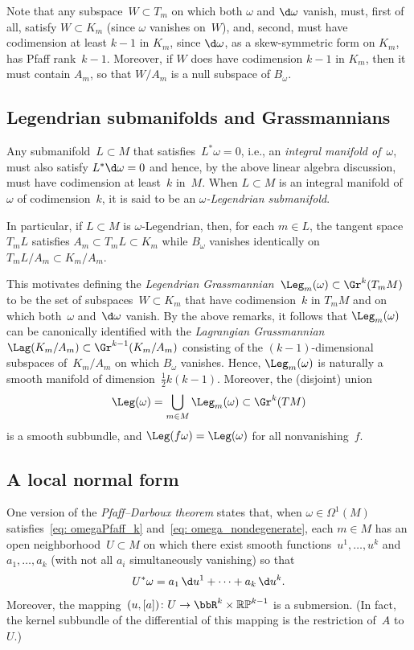 Note that any subspace~$W\subset T_m$ on which both $\omega$ and $\d\omega$
vanish, must, first of all, satisfy $W\subset K_m$
(since $\omega$ vanishes on~$W$), and, second, must have codimension
at least $k{-}1$ in $K_m$, since $\d\omega$, as a skew-symmetric form
on $K_m$, has Pfaff rank~$k{-}1$.
Moreover, if $W$ does have codimension $k{-}1$ in $K_m$,
then it must contain $A_m$, so that $W/A_m$ is a null subspace of $B_\omega$.

\subsection{Legendrian submanifolds and Grassmannians}
Any submanifold~$L\subset M$ that satisfies~$L^*\omega=0$,
i.e., an \emph{integral manifold of~$\omega$},
must also satisfy $L^*\d\omega=0$
and hence, by the above linear algebra discussion,
must have codimension at least~$k$ in~$M$.
When $L\subset M$ is an integral manifold of~$\omega$ of codimension~$k$,
it is said to be an \emph{$\omega$-Legendrian submanifold}.

In particular, if $L\subset M$ is $\omega$-Legendrian,
then, for each $m\in L$, the tangent space $T_mL$
satisfies $A_m\subset T_mL\subset K_m$
while $B_\omega$ vanishes identically on $T_mL/A_m\subset K_m/A_m$.

This motivates defining
the \emph{Legendrian Grassmannian}~$\Leg_m(\omega)\subset\Gr^k(T_mM)$
to be the set of subspaces~$W\subset K_m$
that have codimension~$k$ in $T_mM$
and on which both~$\omega$ and~$\d\omega$ vanish.
By the above remarks, it follows that $\Leg_m(\omega)$
can be canonically identified with the
\emph{Lagrangian Grassmannian}~$\Lag(K_m/A_m)\subset\Gr^{k-1}(K_m/A_m)$
consisting of the $(k{-}1)$-dimensional subspaces of~$K_m/A_m$
on which $B_\omega$ vanishes.
Hence, $\Leg_m(\omega)$ is naturally a smooth manifold
of dimension~$\tfrac12k(k{-}1)$.
Moreover, the (disjoint) union
\[
\Leg(\omega) = \bigcup_{m\in M} \Leg_m(\omega)\subset \Gr^k(TM)
\]
is a smooth subbundle,
and $\Leg(f\omega)=\Leg(\omega)$ for all nonvanishing~$f$.

\subsection{A local normal form}
One version of the \emph{Pfaff--Darboux theorem}
\cite[Chapter II, Theorem~3.1]{MR1083148} states that,
when ${\omega\in\Omega^1(M)}$ satisfies~\eqref{eq: omegaPfaff_k}
and~\eqref{eq: omega_nondegenerate},
each $m\in M$
has an open neighborhood~$U\subset M$
on which there exist smooth functions~$u^1,\ldots,u^k$
and $a_1,\ldots,a_k$ (with not all $a_i$ simultaneously vanishing)
so that
\begin{equation}\label{eq: PfaffDarboux_normalform}
U^*\omega = a_1\,\d u^1 + \cdots + a_k\,\d u^k .
\end{equation}
Moreover,
the mapping~$(u,[a])\colon U\to\bbR^k\times\mathbb{RP}^{k-1}$
is a submersion. (In fact, the kernel subbundle of the differential
of this mapping is the restriction of~$A$ to~$U$.)

